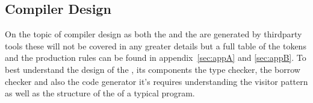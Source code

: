 \subsection{Compiler Design}
\label{sec:CompilerDesign}

On the topic of compiler design as both the \lexer{} and the \parser{}
are generated by thirdparty tools these will not be covered in any greater details
but a full table of the tokens and the production rules can be found in
appendix~\ref{sec:appA} and \ref{sec:appB}. To best understand the design of the
\static, its components the type checker, the borrow checker and also the code
generator it's requires understanding the visitor pattern as well as the
structure of the \ast{} of a typical \lang{} program.








